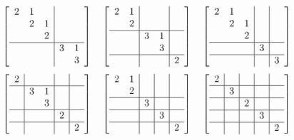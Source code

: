 \documentclass[12pt]{article}
\begin{document}
\[\left[ \begin{array}{ccc|cc} 
2&1&&& \\
&2&1&& \\
&&2&& \\
\hline
&&&3&1 \\
&&&&3 \\
\end{array} \right] \quad \left[ \begin{array}{cc|cc|c} 
2&1&&& \\
&2&&& \\
\hline
&&3&1& \\
&&&3& \\
\hline
&&&&2 \\
\end{array} \right] \quad \left[ \begin{array}{ccc|c|c} 
2&1&&& \\
&2&1&& \\
&&2&& \\
\hline
&&&3& \\
\hline
&&&&3 \\
\end{array} \right] \]\[\left[ \begin{array}{c|cc|c|c} 
2&&&& \\
\hline
&3&1&& \\
&&3&& \\
\hline
&&&2& \\
\hline
&&&&2 \\
\end{array} \right] \quad \left[ \begin{array}{cc|c|c|c} 
2&1&&& \\
&2&&& \\
\hline
&&3&& \\
\hline
&&&3& \\
\hline
&&&&2 \\
\end{array} \right] \quad \left[ \begin{array}{c|c|c|c|c} 
2&&&& \\
\hline
&3&&& \\
\hline
&&2&& \\
\hline
&&&3& \\
\hline
&&&&2 \\
\end{array} \right] \]
\end{document}
